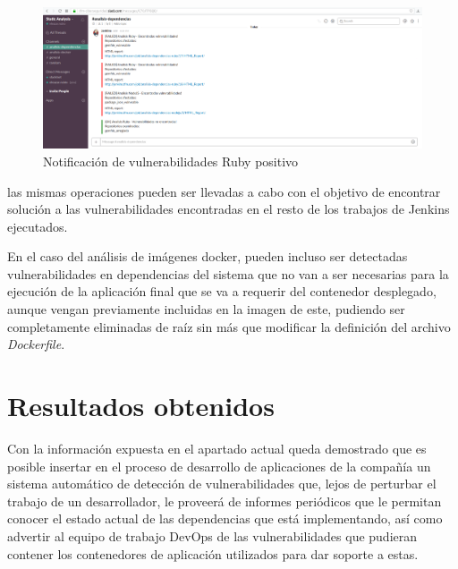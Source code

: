 \begin{figure}[htbp]
	\centering
	\includegraphics[width=1.0\linewidth]
	{desarrollo/figuras/slack_04.png}
	\caption{Notificación de vulnerabilidades Ruby positivo}
	\label{slack_04}
\end{figure}

las mismas operaciones pueden ser llevadas a cabo con el objetivo de encontrar solución a las vulnerabilidades encontradas en el resto de los trabajos de Jenkins ejecutados. 

En el caso del análisis de imágenes docker, pueden incluso ser detectadas vulnerabilidades en dependencias del sistema que no van a ser necesarias para la ejecución de la aplicación final que se va a requerir del contenedor desplegado, aunque vengan previamente incluidas en la imagen de este, pudiendo ser completamente eliminadas de raíz sin más que modificar la definición del archivo \textit{Dockerfile}.

\section{Resultados obtenidos}

Con la información expuesta en el apartado actual queda demostrado que es posible insertar en el proceso de desarrollo de aplicaciones de la compañía un sistema automático de detección de vulnerabilidades que, lejos de perturbar el trabajo de un desarrollador, le proveerá de informes periódicos que le permitan conocer el estado actual de las dependencias que está implementando, así como advertir al equipo de trabajo DevOps de las vulnerabilidades que pudieran contener los contenedores de aplicación utilizados para dar soporte a estas.

\endinput
